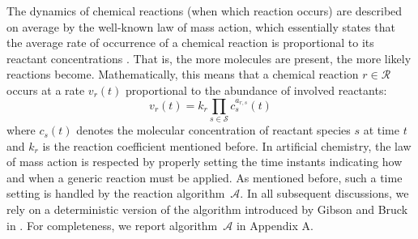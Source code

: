 \documentclass[journal]{IEEEtran}
\begin{document}
{The dynamics of chemical reactions (when which reaction occurs) are described on average by the well-known law of mass action, which essentially states that the average rate of occurrence of a chemical reaction is proportional to its reactant concentrations \cite{Ab86}}. That is, the more molecules are present, the more likely reactions become. Mathematically, this means that a chemical reaction $r \in\mathcal R$ occurs at a rate $v_r(t)$ proportional to the abundance of involved
reactants:
\begin{equation}\label{eq:LoMA}
v_r(t) = k_r \prod \limits_{s \in \mathcal S} c_s^{a_{r,s}}(t)
\end{equation}
where $c_s(t)$ denotes the molecular concentration of reactant species $s$ at time $t$ {and $k_r$ is the reaction coefficient mentioned before. In artificial chemistry, the law of mass action is respected by properly setting the time instants indicating how and when a generic reaction must be applied.} As mentioned before, such a time setting is handled by the reaction algorithm~$\mathcal{A}$. 
{In all subsequent discussions, we rely on a deterministic version of the algorithm introduced by Gibson and Bruck in \cite{GiBr00}. For completeness, we report algorithm~$\mathcal{A}$ in Appendix A.}
\end{document}
